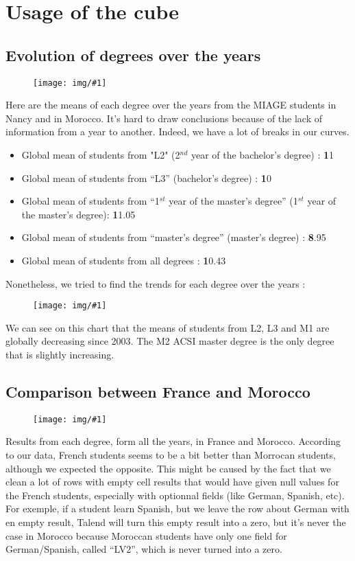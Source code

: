 \documentclass[11pt, a4paper]{article}
\newcommand\image[2]{
	\begin{figure}[H]
	\centering
	\texttt{[image: img/\#1]}
	\end{figure}
}
\begin{document}
    \newpage
    \section{Usage of the cube}
    
    \subsection{Evolution of degrees over the years}

    \image{image10.png}{400px}

    Here are the means of each degree over the years from the MIAGE students in Nancy and in Morocco.
    It’s hard to draw conclusions because of the lack of information from a year to another. Indeed, we have a lot of breaks in our curves.
\begin{itemize}
    \item Global mean of students from "L2" (2$^{nd}$ year of the bachelor's degree) : \textbf 11
    \item Global mean of students from “L3” (bachelor's degree) : \textbf 10
    \item Global mean of students from “1$^{st}$ year of the master's degree” (1$^{st}$ year of the master's degree): \textbf 11.05
    \item Global mean of students from “master's degree” (master's degree) : \textbf 8.95
    \item Global mean of students from all degrees : \textbf 10.43
\end{itemize}
    Nonetheless, we tried to find the trends for each degree over the years :

    \image{image19.png}{400px}
    
    We can see on this chart that the means of students from L2, L3 and M1 are globally decreasing since 2003. The M2 ACSI master degree is the only degree that is slightly increasing.

    \subsection{Comparison between France and Morocco}

    \image{image23.png}{400px}

    Results from each degree, form all the years, in France and Morocco. According to our data, French students seems to be a bit better than Morrocan students, although we expected the opposite.
    This might be caused by the fact that we clean a lot of rows with empty cell results that would have given null values for the French students, especially with optionnal fields (like German, Spanish, etc). For exemple, if a student learn Spanish, but we leave the row about German with en empty result, Talend will turn this empty result into a zero, but it’s never the case in Morocco because Moroccan students have only one field for German/Spanish, called “LV2”, which is never turned into a zero.
    
\end{document}
